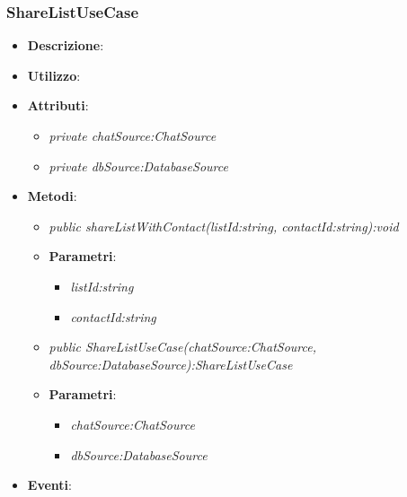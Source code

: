 \subsubsection{ShareListUseCase}
\begin{itemize}
\item \textbf{Descrizione}: 
\item \textbf{Utilizzo}:
\item \textbf{Attributi}: 
\begin{itemize}
\item \textit{private chatSource:ChatSource}\\

\item \textit{private dbSource:DatabaseSource}\\

\end{itemize}
\item \textbf{Metodi}:
\begin{itemize}
\item \textit{public shareListWithContact(listId:string, contactId:string):void}\\

	\item{\textbf{Parametri}: \begin{itemize}
	\item \textit{listId:string}\\
	
	\item \textit{contactId:string}\\
	
	\end{itemize}}
\item \textit{public ShareListUseCase(chatSource:ChatSource, dbSource:DatabaseSource):ShareListUseCase}\\

	\item{\textbf{Parametri}: \begin{itemize}
	\item \textit{chatSource:ChatSource}\\
	
	\item \textit{dbSource:DatabaseSource}\\
	
	\end{itemize}}
\end{itemize}
\item \textbf{Eventi}:
\end{itemize}

